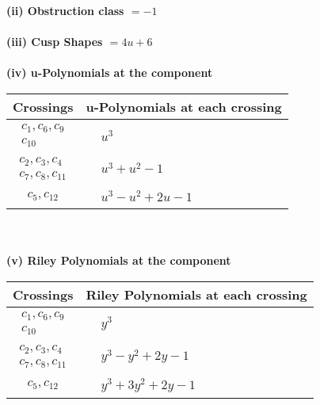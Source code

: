 \documentclass[1p]{elsarticle_modified}
\theoremstyle{definition}
\begin{document}
\flushleft \textbf{(ii) Obstruction class $= -1$}\\~\\
\flushleft \textbf{(iii) Cusp Shapes $= 4 u+6$}\\~\\
\newpage\renewcommand{\arraystretch}{1}
\flushleft \textbf{(iv) u-Polynomials at the component}\newline \\
\begin{tabular}{m{50pt}|m{274pt}}
Crossings & \hspace{64pt}u-Polynomials at each crossing \\
\hline $$\begin{aligned}c_{1},c_{6},c_{9}\\c_{10}\end{aligned}$$&$\begin{aligned}
&u^3
\end{aligned}$\\
\hline $$\begin{aligned}c_{2},c_{3},c_{4}\\c_{7},c_{8},c_{11}\end{aligned}$$&$\begin{aligned}
&u^3+u^2-1
\end{aligned}$\\
\hline $$\begin{aligned}c_{5},c_{12}\end{aligned}$$&$\begin{aligned}
&u^3- u^2+2 u-1
\end{aligned}$\\
\hline
\end{tabular}\\~\\
\newpage\renewcommand{\arraystretch}{1}
\flushleft \textbf{(v) Riley Polynomials at the component}\newline \\
\begin{tabular}{m{50pt}|m{274pt}}
Crossings & \hspace{64pt}Riley Polynomials at each crossing \\
\hline $$\begin{aligned}c_{1},c_{6},c_{9}\\c_{10}\end{aligned}$$&$\begin{aligned}
&y^3
\end{aligned}$\\
\hline $$\begin{aligned}c_{2},c_{3},c_{4}\\c_{7},c_{8},c_{11}\end{aligned}$$&$\begin{aligned}
&y^3- y^2+2 y-1
\end{aligned}$\\
\hline $$\begin{aligned}c_{5},c_{12}\end{aligned}$$&$\begin{aligned}
&y^3+3 y^2+2 y-1
\end{aligned}$\\
\hline
\end{tabular}\\~\\
\end{document}
